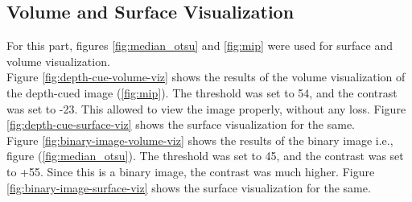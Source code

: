 \documentclass{article}
\begin{document}
\subsection*{Volume and Surface Visualization}
For this part, figures \ref{fig:median_otsu} and \ref{fig:mip} were used for surface and volume visualization.\\
Figure \ref{fig:depth-cue-volume-viz} shows the results of the volume visualization of the depth-cued image (\ref{fig:mip}). The threshold was set to 54, and the contrast was set to -23. This allowed to view the image properly, without any loss. Figure \ref{fig:depth-cue-surface-viz} shows the surface visualization for the same. \\
Figure \ref{fig:binary-image-volume-viz} shows the results of the binary image i.e., figure (\ref{fig:median_otsu}). The threshold was set to 45, and the contrast was set to +55. Since this is a binary image, the contrast was much higher. Figure \ref{fig:binary-image-surface-viz} shows the surface visualization for the same. \\
\end{document}
